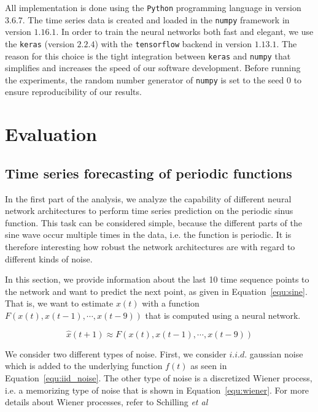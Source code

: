 \documentclass{article}
\begin{document}
All implementation is done using the \texttt{Python} programming language in
version $3.6.7$. The time series data is created and loaded in the
\texttt{numpy} framework in version $1.16.1$. In order to train the neural
networks both fast and elegant, we use the \texttt{keras} (version $2.2.4$)
with the
\texttt{tensorflow} backend in version $1.13.1$.
The reason for this choice is the tight
integration between \texttt{keras} and \texttt{numpy} that simplifies and
increases the speed of our software development. Before running the experiments,
the random number generator of \texttt{numpy} is set to the seed $0$ to ensure
reproducibility of our results.

\section{Evaluation} 
\subsection{Time series forecasting of periodic functions}
\label{sec:sine} 
In the first part of the analysis, we analyze the capability of different neural
network architectures to perform time series prediction on the periodic sinus
function. This task can be considered simple, because the different parts of the
sine wave occur multiple times in the data, i.e. the function is periodic.
It is therefore interesting how
robust the network architectures are with regard to different kinds of noise.

In this section, we provide information about the last 10 time sequence points
to the network and want to predict the next point, as given in 
Equation~\ref{equ:sine}. That is, we want to estimate $x(t)$ with a function 
$F(x(t), x(t-1), \cdots, x(t-9))$ that is computed using a neural network.

\begin{equation}
  \hat{x} (t + 1) \approx F(x(t), x(t-1), \cdots, x(t-9))
  \label{equ:sine}
\end{equation}

We consider two different types of noise. First, we consider $i.i.d.$ gaussian 
noise which is added to the underlying function $f(t)$
as seen in Equation~\ref{equ:iid_noise}. The other type of noise is a 
discretized Wiener process, i.e. a memorizing type of noise that is shown in 
Equation~\ref{equ:wiener}.
For more details about Wiener processes, refer to Schilling 
\textit{et al} \cite{schilling2014}
\end{document}
